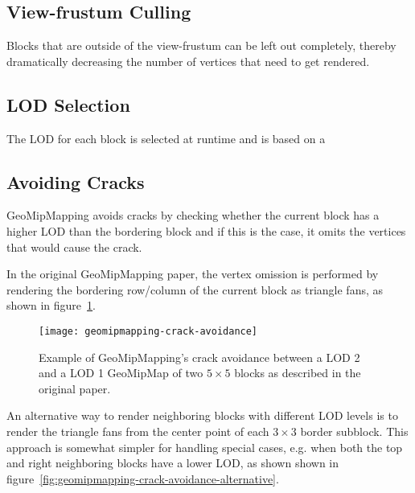 \subsection{View-frustum Culling}
Blocks that are outside of the view-frustum can be left out completely, thereby dramatically decreasing the number 
of vertices that need to get rendered.

\subsection{LOD Selection}
The LOD for each block is selected at runtime and is based on a 

\subsection{Avoiding Cracks}

GeoMipMapping avoids cracks by checking whether the
current block has a higher LOD than the bordering block and if this is the case,
it omits the vertices that would cause the crack.

In the original GeoMipMapping paper,
the vertex omission is performed by rendering the bordering row/column of the current block
as triangle fans, as shown in figure~\ref{fig:geomipmapping-crack-avoidance}.

\begin{figure}[H]
  \centering
  \texttt{[image: geomipmapping-crack-avoidance]}
  \caption{Example of GeoMipMapping's crack avoidance between a LOD 2 and a LOD 1 GeoMipMap of two $5 \times 5$ blocks as described in the original paper.}\label{fig:geomipmapping-crack-avoidance}
\end{figure}

An alternative way to render neighboring blocks with different LOD levels is to render the triangle fans from the center point of each $3 \times 3$ border subblock. 
This approach is somewhat simpler for handling special cases, e.g. when both the top and right neighboring blocks have a lower LOD,
as shown shown in figure~\ref{fig:geomipmapping-crack-avoidance-alternative}.


